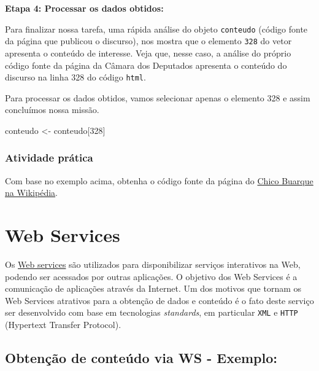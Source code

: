 \documentclass[]{book}
\newenvironment{Shaded}{\begin{snugshade}}{\end{snugshade}}
\newcommand{\DecValTok}[1]{\textcolor[rgb]{0.00,0.00,0.81}{#1}}
\newcommand{\NormalTok}[1]{#1}
\newcommand{\StringTok}[1]{\textcolor[rgb]{0.31,0.60,0.02}{#1}}
\begin{document}
\textbf{Etapa 4: Processar os dados obtidos:}

Para finalizar nossa tarefa, uma rápida análise do objeto \texttt{conteudo} (código fonte
da página que publicou o discurso), nos mostra que o elemento \texttt{328} do vetor apresenta
o conteúdo de interesse. Veja que, nesse caso, a análise do próprio código fonte da
página da Câmara dos Deputados apresenta o conteúdo do discurso na linha 328 do código \texttt{html}.

Para processar os dados obtidos, vamos selecionar apenas o elemento 328 e assim concluímos nossa missão.

\begin{Shaded}
\begin{Highlighting}[]
\NormalTok{conteudo <-}\StringTok{ }\NormalTok{conteudo[}\DecValTok{328}\NormalTok{]}
\end{Highlighting}
\end{Shaded}

\hypertarget{atividade-pruxe1tica}{%
\subsubsection{Atividade prática}\label{atividade-pruxe1tica}}

Com base no exemplo acima, obtenha o código fonte da página do \href{https://pt.wikipedia.org/wiki/Chico_Buarque}{Chico Buarque na Wikipédia}.

\hypertarget{web-services}{%
\section{Web Services}\label{web-services}}

Os \href{https://pt.wikipedia.org/wiki/Web_service}{Web services} são utilizados para
disponibilizar serviços interativos na Web, podendo ser acessados por outras
aplicações. O objetivo dos Web Services é a comunicação de aplicações através da Internet.
Um dos motivos que tornam os Web Services atrativos para a obtenção de dados e conteúdo é
o fato deste serviço ser desenvolvido com base em tecnologias \emph{standards}, em particular
\texttt{XML} e \texttt{HTTP} (Hypertext Transfer Protocol).

\hypertarget{obtenuxe7uxe3o-de-conteuxfado-via-ws---exemplo}{%
\subsection{Obtenção de conteúdo via WS - Exemplo:}\label{obtenuxe7uxe3o-de-conteuxfado-via-ws---exemplo}}
\end{document}
